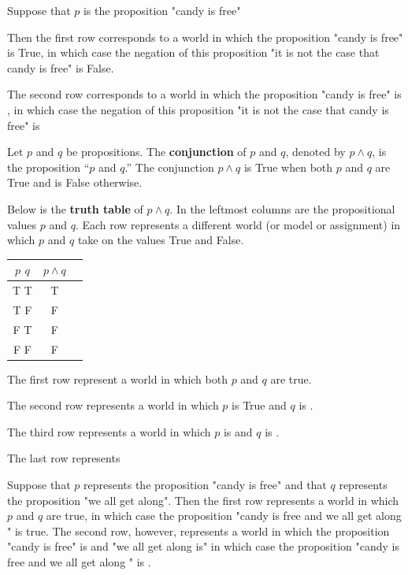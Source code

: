 Suppose that $p$ is the proposition "candy is free"


Then the first row corresponds to a world in which the proposition "candy is free" is True, in which case the negation of this proposition "it is not the case that candy is free" is False.

The second row corresponds to a world in which the proposition "candy is free" is , in which case the negation of this proposition "it is not the case that candy is free" is 

\begin{defn}
Let $p$ and $q$ be propositions. The \textbf{conjunction} of $p$ and $q$, denoted by $p \land q$, is the proposition
“$p$ and $q$.” The conjunction $p \land q$ is True when both $p$ and $q$ are True and is False otherwise.
\end{defn}

\begin{exmp}
Below is the \textbf{truth table} of $p \land q$. In the leftmost columns are the propositional values $p$ and $q$. Each row represents a different world (or model or assignment) in which $p$ and $q$ take on the values True and False. 

\begin{center}
\begin{tabular}{ | c | c | c |} 
  \hline
 $p$ $q$ & $ p \land q$ \\
 \hline
  T T & T \\ 
  T F & F \\ 
  F T & F \\ 
  F F & F \\ 
  \hline
\end{tabular}
\end{center}

The first row represent a world in which both $p$ and $q$ are true. 

The second row represents a world in which $p$ is True and $q$ is .

The third row represents a world in which $p$ is  and $q$ is .

The last row represents 

Suppose that $p$ represents the proposition "candy is free" and that $q$ represents the proposition "we all get along".
Then the first row represents a world in which $p$ and $q$ are true, in which case the proposition "candy is free and we all get along " is true. The second row, however, represents a world in which the proposition "candy is free" is  and "we all get along is"  in which case the proposition "candy is free and we all get along " is .
\end{exmp}


